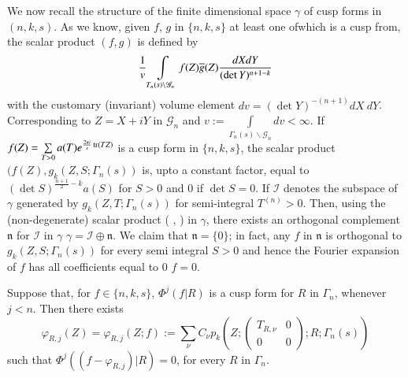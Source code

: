 We now recall the structure of the finite dimensional space $\gamma$
of cusp forms in $(n,k,s)$. As we know, given $f$, $g$ in $\{n,k,s\}$
at least one of\pageoriginale which is a cusp from, the scalar product
$(f,g)$ is defined by
$$
\frac{1}{v}\int\limits_{T_{n}(s)\backslash
  \mathscr{G}_{n}}f(Z)\overline{g}(Z)\frac{dXdY}{(\det Y)^{n+1-k}}
$$
with the customary (invariant) volume element $dv=(\det
Y)^{-(n+1)}dX\ dY$. Corresponding to $Z=X+iY$ in $\mathscr{G}_{n}$ and
$v:=\int\limits_{\Gamma_{n}(s)\backslash
  \mathscr{G}_{n}}dv<\infty$. If
$f(Z)=\sum\limits_{T>0}a(T)e^{\frac{2\pi i}{s}\operatorname{tr}(TZ)}$ is a cusp form
in $\{n,k,s\}$, the scalar product $(f(Z),g_{k}(Z,S;\Gamma_{n}(s))$
is, upto a constant factor, equal to $(\det S)^{\frac{n+1}{2}-k}a(S)$
for $S>0$ and $0$ if $\det S=0$. If $\mathcal{I}$ denotes the subspace
of $\gamma$ generated by $g_{k}(Z,T;\Gamma_{n}(s))$ for semi-integral
$T^{(n)}>0$. Then, using the (non-degenerate) scalar product ( , ) in
$\gamma$, there exists an orthogonal complement $\mathfrak{n}$ for
$\mathcal{I}$ in $\gamma$ \ie $\gamma=\mathcal{I}\oplus
\mathfrak{n}$. We claim that $\mathfrak{n}=\{0\}$; in fact, any $f$ in
$\mathfrak{n}$ is orthogonal to $g_{k}(Z,S;\Gamma_{n}(s))$ for every
semi integral $S>0$ and hence the Fourier expansion of $f$ has all
coefficients equal to $0$ \ie $f=0$.

\begin{sublemma}\label{c1:lem-1.6.7}
Suppose that, for $f\in \{n,k,s\}$, $\Phi^{j}(f|R)$ is a cusp form for
$R$ in $\Gamma_{n}$, whenever $j<n$. Then there exists
$$
\varphi_{R,j}(Z)=\varphi_{R,j}(Z;f):=\sum_{\nu}C_{\nu}p_{k}(Z;
\begin{pmatrix}
T_{R,\nu} & 0\\
0 & 0
\end{pmatrix};
R; \Gamma_{n}(s))
$$
such that $\Phi^{j}((f-\varphi_{R,j})|R)=0$, for every $R$ in $\Gamma_{n}$.
\end{sublemma}

